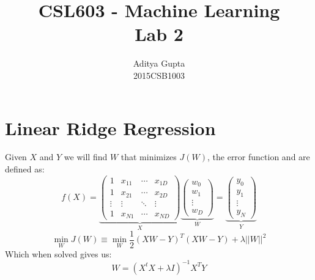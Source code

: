 \documentclass{article}
\title{CSL603 - Machine Learning\\Lab 2}
\author{Aditya Gupta\\2015CSB1003}
\begin{document}
\maketitle
\section*{Linear Ridge Regression}
Given $X$ and $Y$ we will find $W$ that minimizes $J(W)$, the error function and are defined as:
$$f(X)=
\underbrace{
\begin{pmatrix}
1&x_{11}&\cdots&x_{1D}\\
1&x_{21}&\cdots&x_{2D}\\
\vdots&\vdots&\ddots&\vdots\\
1&x_{N1}&\cdots&x_{ND}
\end{pmatrix}}_{X}
\underbrace{
\begin{pmatrix}
w_0\\w_1\\\vdots\\w_D
\end{pmatrix}}_{W}
=
\underbrace{
\begin{pmatrix}
y_0\\y_1\\\vdots\\y_N
\end{pmatrix}}_{Y}$$
$$
\min_W J(W)\equiv\min_W\frac12(XW-Y)^T(XW-Y)+\lambda||W||^2
$$
Which when solved gives us:
$$W=(X^tX+\lambda I)^{-1}X^TY$$
\end{document}
